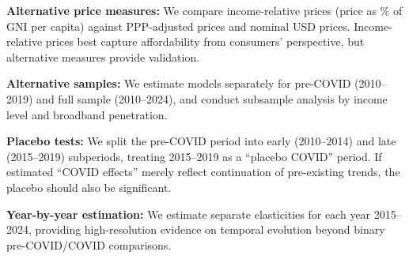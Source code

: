 \textbf{Alternative price measures:} We compare income-relative prices (price as \% of GNI per capita) against PPP-adjusted prices and nominal USD prices. Income-relative prices best capture affordability from consumers' perspective, but alternative measures provide validation.

\textbf{Alternative samples:} We estimate models separately for pre-COVID (2010--2019) and full sample (2010--2024), and conduct subsample analysis by income level and broadband penetration.

\textbf{Placebo tests:} We split the pre-COVID period into early (2010--2014) and late (2015--2019) subperiods, treating 2015--2019 as a ``placebo COVID'' period. If estimated ``COVID effects'' merely reflect continuation of pre-existing trends, the placebo should also be significant.

\textbf{Year-by-year estimation:} We estimate separate elasticities for each year 2015--2024, providing high-resolution evidence on temporal evolution beyond binary pre-COVID/COVID comparisons.

